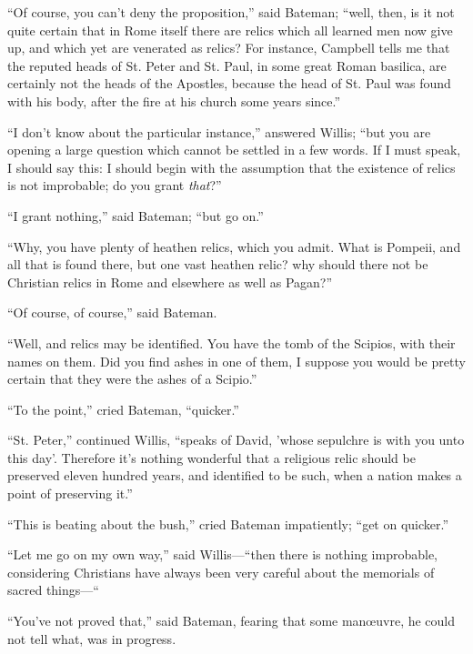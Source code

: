 ``Of course, you can't deny the proposition,'' said
Bateman; ``well, then, is it not quite certain that in Rome itself
there are relics which all learned men now give up, and which yet are
venerated as relics? For instance, Campbell tells me that the reputed
heads of St. Peter and St. Paul, in some great Roman basilica, are
certainly not the heads of the Apostles, because the head of St. Paul
was found with his body, after the fire at his church some years
since.''

``I don't know about the particular instance,'' answered
Willis; ``but you are opening a large question which cannot be
settled in a few words. If I must speak, I should say this: I should
begin with the assumption that the existence of relics is not
improbable; do you grant \emph{that}?''

``I grant nothing,'' said Bateman; ``but go on.''

``Why, you have plenty of heathen relics, which you admit. What
is Pompeii, and all that is found there, but one vast heathen relic?
why should there not be Christian relics in Rome and elsewhere as well
as Pagan?''

``Of course, of course,'' said Bateman.

``Well, and relics may be identified. You have the tomb of the
Scipios, with their names on them. Did you find ashes in one of them,
I suppose you would be pretty certain that they were the ashes of a
Scipio.''

``To the point,'' cried Bateman, ``quicker.''

``St. Peter,'' continued Willis, ``speaks of David,
'whose sepulchre is with you unto this day'. Therefore it's nothing
wonderful that a religious relic should be preserved eleven hundred
years, and identified to be such, when a nation makes a point of
preserving it.''

``This is beating about the bush,'' cried Bateman
impatiently; ``get on quicker.''

``Let me go on my own way,'' said Willis—``then there
is nothing improbable, considering Christians have always been very
careful about the memorials of sacred things—``

``You've not proved that,'' said Bateman, fearing that some
manœuvre, he could not tell what, was in progress.

